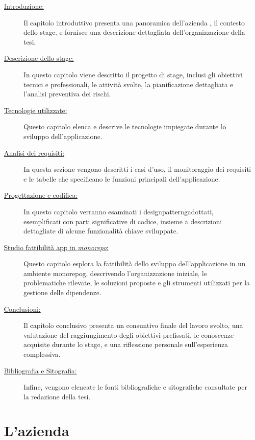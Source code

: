 \begin{description}
    \item[{\hyperref[chap:introduzione]{Introduzione:}}] Il capitolo introduttivo presenta una panoramica dell'azienda \myAzienda, il contesto dello stage, e fornisce una descrizione dettagliata dell'organizzazione della tesi.
    \item[{\hyperref[chap:stage_descrizione]{Descrizione dello stage:}}] In questo capitolo viene descritto il progetto di stage, inclusi gli obiettivi tecnici e professionali, le attività svolte, la pianificazione dettagliata e l'analisi preventiva dei rischi.
    \item[{\hyperref[chap:tecnologie_utilizzate]{Tecnologie utilizzate:}}] Questo capitolo elenca e descrive le tecnologie impiegate durante lo sviluppo dell'applicazione.
    \item[{\hyperref[chap:analisi_requisiti]{Analisi dei requisiti:}}] In questa sezione vengono descritti i casi d'uso, il monitoraggio dei requisiti e le tabelle che specificano le funzioni principali dell'applicazione.
    \item[{\hyperref[chap:design_coding]{Progettazione e codifica:}}] In questo capitolo verranno esaminati i \gls{designpatterng}\glox adottati, esemplificati con parti significative di codice, insieme a descrizioni dettagliate di alcune funzionalità chiave sviluppate.
    \item[{\hyperref[chap:studio_fattibilita]{Studio fattibilità app in \textit{monorepo}:}}] Questo capitolo esplora la fattibilità dello sviluppo dell'applicazione in un ambiente \gls{monorepog}\glox, descrivendo l'organizzazione iniziale, le problematiche rilevate, le soluzioni proposte e gli strumenti utilizzati per la gestione delle dipendenze.
    \item[{\hyperref[chap:conclusioni]{Conclusioni:}}] Il capitolo conclusivo presenta un consuntivo finale del lavoro svolto, una valutazione del raggiungimento degli obiettivi prefissati, le conoscenze acquisite durante lo stage, e una riflessione personale sull'esperienza complessiva.
    \item[{\hyperref[cap:bibliography]{Bibliografia e Sitografia:}}] Infine, vengono elencate le fonti bibliografiche e sitografiche consultate per la redazione della tesi.
\end{description}
\pagebreak
\section{L'azienda}

